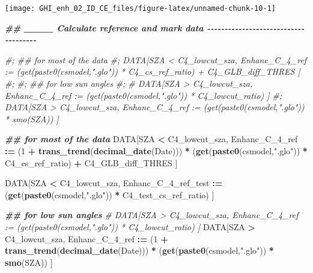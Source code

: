 \documentclass[
  10pt,
  a4paper,oneside]{article}
\newenvironment{Shaded}{\begin{snugshade}}{\end{snugshade}}
\newcommand{\CommentTok}[1]{\textcolor[rgb]{0.56,0.35,0.01}{\textit{#1}}}
\newcommand{\DecValTok}[1]{\textcolor[rgb]{0.00,0.00,0.81}{#1}}
\newcommand{\DocumentationTok}[1]{\textcolor[rgb]{0.56,0.35,0.01}{\textbf{\textit{#1}}}}
\newcommand{\FunctionTok}[1]{\textcolor[rgb]{0.13,0.29,0.53}{\textbf{#1}}}
\newcommand{\NormalTok}[1]{#1}
\newcommand{\SpecialCharTok}[1]{\textcolor[rgb]{0.81,0.36,0.00}{\textbf{#1}}}
\newcommand{\StringTok}[1]{\textcolor[rgb]{0.31,0.60,0.02}{#1}}
\begin{document}
\begin{center}\texttt{[image: GHI\_enh\_02\_ID\_CE\_files/figure-latex/unnamed-chunk-10-1]} \end{center}

\begin{Shaded}
\begin{Highlighting}[]
\DocumentationTok{\#\# \_\_\_\_ Calculate reference and mark data  {-}{-}{-}{-}{-}{-}{-}{-}{-}{-}{-}{-}{-}{-}{-}{-}{-}{-}{-}{-}{-}{-}{-}{-}{-}{-}{-}{-}{-}{-}{-}{-}{-}{-}{-}{-}{-}}

\CommentTok{\#; \#\# for most of the data}
\CommentTok{\#; DATA[SZA \textless{} C4\_lowcut\_sza, Enhanc\_C\_4\_ref := (get(paste0(csmodel,".glo")) * C4\_cs\_ref\_ratio) + C4\_GLB\_diff\_THRES ]}
\CommentTok{\#;}
\CommentTok{\#; \#\# for low sun angles}
\CommentTok{\#; \# DATA[SZA \textgreater{} C4\_lowcut\_sza, Enhanc\_C\_4\_ref := (get(paste0(csmodel,".glo")) * C4\_lowcut\_ratio) ]}
\CommentTok{\#; DATA[SZA \textgreater{} C4\_lowcut\_sza, Enhanc\_C\_4\_ref := (get(paste0(csmodel,".glo")) * smo(SZA)) ]}


\DocumentationTok{\#\# for most of the data}
\NormalTok{DATA[SZA }\SpecialCharTok{\textless{}}\NormalTok{ C4\_lowcut\_sza,}
\NormalTok{     Enhanc\_C\_4\_ref }\SpecialCharTok{:=}\NormalTok{ (}\DecValTok{1} \SpecialCharTok{+} \FunctionTok{trans\_trend}\NormalTok{(}\FunctionTok{decimal\_date}\NormalTok{(Date))) }\SpecialCharTok{*}\NormalTok{ (}\FunctionTok{get}\NormalTok{(}\FunctionTok{paste0}\NormalTok{(csmodel,}\StringTok{".glo"}\NormalTok{)) }\SpecialCharTok{*}\NormalTok{ C4\_cs\_ref\_ratio) }\SpecialCharTok{+}\NormalTok{ C4\_GLB\_diff\_THRES ]}

\NormalTok{DATA[SZA }\SpecialCharTok{\textless{}}\NormalTok{ C4\_lowcut\_sza,}
\NormalTok{     Enhanc\_C\_4\_ref\_test }\SpecialCharTok{:=}\NormalTok{                                    (}\FunctionTok{get}\NormalTok{(}\FunctionTok{paste0}\NormalTok{(csmodel,}\StringTok{".glo"}\NormalTok{)) }\SpecialCharTok{*}\NormalTok{ C4\_test\_cs\_ref\_ratio) ]}

\DocumentationTok{\#\# for low sun angles}
\CommentTok{\# DATA[SZA \textgreater{} C4\_lowcut\_sza, Enhanc\_C\_4\_ref := (get(paste0(csmodel,".glo")) * C4\_lowcut\_ratio) ]}
\NormalTok{DATA[SZA }\SpecialCharTok{\textgreater{}}\NormalTok{ C4\_lowcut\_sza,}
\NormalTok{     Enhanc\_C\_4\_ref }\SpecialCharTok{:=}\NormalTok{ (}\DecValTok{1} \SpecialCharTok{+} \FunctionTok{trans\_trend}\NormalTok{(}\FunctionTok{decimal\_date}\NormalTok{(Date))) }\SpecialCharTok{*}\NormalTok{ (}\FunctionTok{get}\NormalTok{(}\FunctionTok{paste0}\NormalTok{(csmodel,}\StringTok{".glo"}\NormalTok{)) }\SpecialCharTok{*} \FunctionTok{smo}\NormalTok{(SZA)) ]}


\end{Highlighting}
\end{Shaded}
\end{document}

